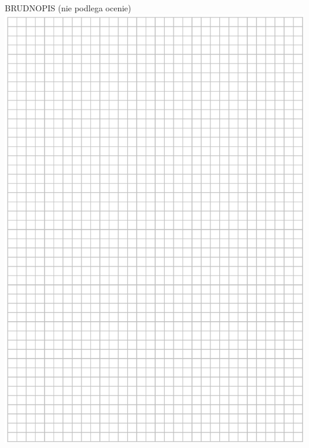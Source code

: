 \documentclass[10pt]{article}
\begin{document}
BRUDNOPIS (nie podlega ocenie)\\
\includegraphics[max width=\textwidth, center]{2024_11_21_465acd0c12fa3e05e8a7g-09}
\end{document}
